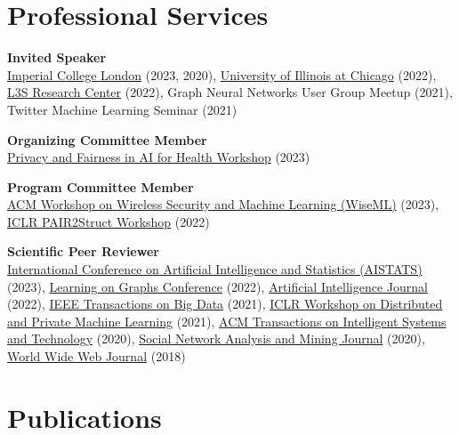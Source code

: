 \documentclass[11pt]{article}
\begin{document}
\section{Professional Services}

\begin{outerlist}
  \item \textbf{Invited Speaker}\\
  \href{https://www.imperial.ac.uk/}{Imperial College London} (2023, 2020), \href{https://www.uic.edu/}{University of Illinois at Chicago} (2022), \href{https://www.l3s.de/}{L3S Research Center} (2022), Graph Neural Networks User Group Meetup (2021), Twitter Machine Learning Seminar (2021)

	\item \textbf{Organizing Committee Member}\\
	\href{https://priv-fair-ai-uk.github.io}{Privacy and Fairness in AI for Health Workshop} (2023)

	\item \textbf{Program Committee Member}\\
	\href{https://wisec2023.surrey.ac.uk/wiseml2023/}{ACM Workshop on Wireless Security and Machine Learning (WiseML)} (2023),
	\href{https://pair2struct-workshop.github.io/}{ICLR PAIR2Struct Workshop} (2022)

	\item \textbf{Scientific Peer Reviewer}\\
	\href{http://aistats.org/aistats2023/}{International Conference on Artificial Intelligence and Statistics (AISTATS)} (2023),
	\href{https://logconference.org/}{Learning on Graphs Conference} (2022),
	\href{https://www.journals.elsevier.com/artificial-intelligence}{Artificial Intelligence Journal} (2022),
	\href{https://ieeexplore.ieee.org/xpl/RecentIssue.jsp?punumber=6687317}{IEEE Transactions on Big Data} (2021),
	\href{https://dp-ml.github.io/2021-workshop-ICLR/}{ICLR Workshop on Distributed and Private Machine Learning} (2021),
	\href{https://dl.acm.org/journal/tist}{ACM Transactions on Intelligent Systems and Technology} (2020),
	\href{https://www.springer.com/journal/13278}{Social Network Analysis and Mining Journal} (2020),
	\href{https://www.springer.com/journal/11280}{World Wide Web Journal} (2018)

\end{outerlist}

\section{Publications}
\end{document}
